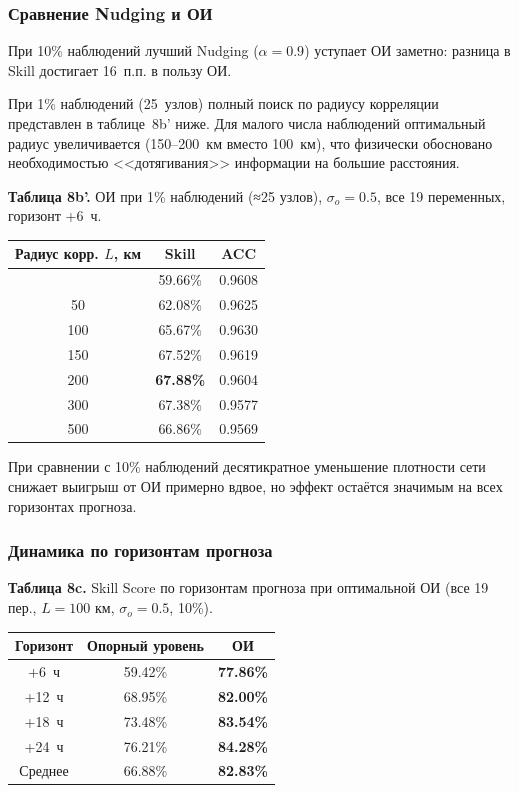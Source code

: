 \documentclass[14pt,a4paper]{extarticle}
\newcounter{none}
\numberwithin{table}{section}
\numberwithin{figure}{section}
\numberwithin{equation}{section}
\begin{document}
\subsubsection{Сравнение Nudging и ОИ}

При 10\% наблюдений лучший Nudging (\(\alpha = 0.9\)) уступает ОИ
заметно: разница в Skill достигает 16~п.п. в пользу ОИ.

При 1\% наблюдений (25~узлов) полный поиск по радиусу корреляции
представлен в таблице~8b' ниже. Для малого числа наблюдений
оптимальный радиус увеличивается (150--200~км вместо 100~км),
что физически обосновано необходимостью <<дотягивания>> информации
на большие расстояния.

\textbf{Таблица 8b'.} ОИ при 1\% наблюдений (≈25 узлов),
$\sigma_o = 0.5$, все 19 переменных, горизонт +6~ч.

{\def\LTcaptype{none}
\begin{longtable}[]{@{}ccc@{}}
\toprule\noalign{}
Радиус корр. $L$, км & Skill & ACC \\
\midrule\noalign{}
\endhead
\bottomrule\noalign{}
\endlastfoot
10  & 59.66\% & 0.9608 \\
50  & 62.08\% & 0.9625 \\
100 & 65.67\% & 0.9630 \\
150 & 67.52\% & 0.9619 \\
200 & \textbf{67.88\%} & 0.9604 \\
300 & 67.38\% & 0.9577 \\
500 & 66.86\% & 0.9569 \\
\end{longtable}
}

При сравнении с 10\% наблюдений десятикратное уменьшение плотности
сети снижает выигрыш от ОИ примерно вдвое, но эффект остаётся
значимым на всех горизонтах прогноза.

\subsubsection{Динамика по горизонтам прогноза}

\textbf{Таблица 8c.} Skill Score по горизонтам прогноза при оптимальной
ОИ (все 19 пер., \(L = 100\) км, \(\sigma_o = 0.5\), 10\%).

{\def\LTcaptype{none}
\begin{longtable}[]{@{}ccc@{}}
\toprule\noalign{}
Горизонт & Опорный уровень & ОИ \\
\midrule\noalign{}
\endhead
\bottomrule\noalign{}
\endlastfoot
+6~ч & 59.42\% & \textbf{77.86\%} \\
+12~ч & 68.95\% & \textbf{82.00\%} \\
+18~ч & 73.48\% & \textbf{83.54\%} \\
+24~ч & 76.21\% & \textbf{84.28\%} \\
Среднее & 66.88\% & \textbf{82.83\%} \\
\end{longtable}
}
\end{document}
